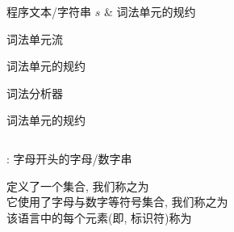 
\begin{frame}{}
\end{frame}

\begin{frame}{}
  \begin{center}
     程序文本/字符串 $s$ \& 词法单元的规约

    \vspace{0.50cm}

    \vspace{0.30cm}
     词法单元流
  \end{center}
\end{frame}

\begin{frame}{}
  \begin{center}
     词法单元的规约

    \vspace{0.50cm}

    \vspace{0.30cm}
     词法分析器
  \end{center}
\end{frame}

\begin{frame}{}
  \begin{center}
    词法单元的规约

    \vspace{0.40cm}
    \begin{columns}
    \end{columns}

    \vspace{0.60cm}
  \end{center}
\end{frame}

\begin{frame}{}
  \begin{center}
    \id: 字母开头的字母/数字串

    \vspace{0.80cm}
    \id{} 定义了一个集合, 我们称之为 \\[15pt]
    它使用了字母与数字等符号集合, 我们称之为 \\[15pt]
    该语言中的每个元素(即, 标识符)称为
  \end{center}
\end{frame}

